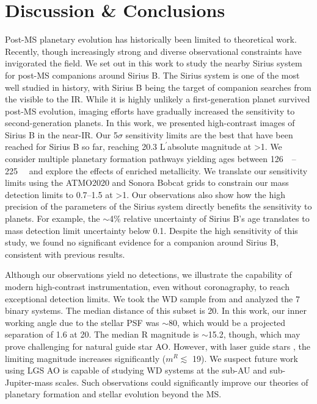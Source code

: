 \documentclass[twocolumn]{aastex631}
\newcommand\Lp{$\mathrm{L}^\prime$}
\begin{document}
\section{Discussion \& Conclusions}\label{sec:conclusion}

Post-MS planetary evolution has historically been limited to theoretical work. Recently, though increasingly strong and diverse observational constraints have invigorated the field. We set out in this work to study the nearby Sirius system for post-MS companions around Sirius B. The Sirius system is one of the most well studied in history, with Sirius B being the target of companion searches from the visible to the IR. While it is highly unlikely a first-generation planet survived post-MS evolution, imaging efforts have gradually increased the sensitivity to second-generation planets. In this work, we presented high-contrast images of Sirius B in the near-IR. Our 5$\sigma$ sensitivity limits are the best that have been reached for Sirius B so far, reaching \num{20.3} \Lp absolute magnitude at \textgreater\qty{1}{\au}. We consider multiple planetary formation pathways yielding ages between \qtyrange{126}{225}{\mega\year} and explore the effects of enriched metallicity. We translate our sensitivity limits using the ATMO2020 and Sonora Bobcat grids to constrain our mass detection limits to \qtyrange{0.7}{1.5}{\jupitermass} at \textgreater\qty{1}{\au}. Our observations also show how the high precision of the parameters of the Sirius system directly benefits the sensitivity to planets. For example, the $\sim$4\% relative uncertainty of Sirius B's age translates to mass detection limit uncertainty below \qty{0.1}{\jupitermass}. Despite the high sensitivity of this study, we found no significant evidence for a companion around Sirius B, consistent with previous results.

Although our observations yield no detections, we illustrate the capability of modern high-contrast instrumentation, even without coronagraphy, to reach exceptional detection limits. We took the WD sample from \citet{holberg25ParsecLocal2016} and analyzed the 7 binary systems. The median distance of this subset is \qty{20}{\parsec}. In this work, our inner working angle due to the stellar PSF was $\sim$\qty{80}{\milliarcsecond}, which would be a projected separation of \qty{1.6}{\au} at \qty{20}{\parsec}. The median R magnitude is $\sim$\num{15.2}, though, which may prove challenging for natural guide star AO. However, with laser guide stars \citep[LGS; e.g.,][]{vandamKeckObservatoryLaser2006,baranecRoboAO2FacilityRapid2018}, the limiting magnitude increases significantly ($m^R\lesssim$ \num{19}). We suspect future work using LGS AO is capable of studying WD systems at the sub-AU and sub-Jupiter-mass scales. Such observations could significantly improve our theories of planetary formation and stellar evolution beyond the MS.
\end{document}
